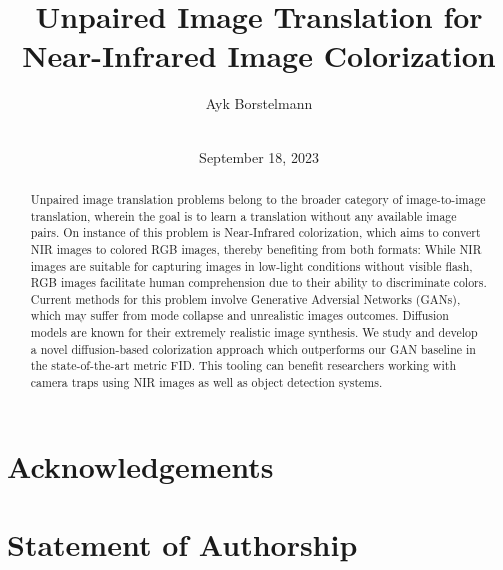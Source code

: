 \documentclass[ba,logo]{ivs-thesis}
\title{Unpaired Image Translation for Near-Infrared Image Colorization}
\author{Ayk Borstelmann\\\birthinfo{March 28, 2002 in Aschaffenburg}\\\matricnumber{3441004}}
\date{September 18, 2023}
\begin{document}
\frontmatter

\maketitle

\cleardoublepage
\begin{abstract}
	Unpaired image translation problems belong to the broader category of image-to-image translation, 
	wherein the goal is to learn a translation without any available image pairs. 
	On instance of this problem is Near-Infrared colorization, which aims to convert NIR images to colored RGB images,
	thereby benefiting from both formats:
	While NIR images are suitable for capturing images in low-light conditions without visible flash, 
	RGB images facilitate human comprehension due to their ability to discriminate colors. 
	Current methods for this problem involve Generative Adversial Networks (GANs), 
	which may suffer from mode collapse and unrealistic images outcomes. 
	Diffusion models are known for their extremely realistic image synthesis. 
	We study and develop a novel diffusion-based colorization approach which outperforms our GAN baseline in the state-of-the-art metric FID. 
	This tooling can benefit researchers working with camera traps using NIR images as well as object detection systems.
\end{abstract}

\chapter*{Acknowledgements}

\cleardoublepage
\chapter*{Statement of Authorship}

% 

\cleardoublepage
\tableofcontents


\mainmatter









\begingroup

\backmatter

\printbibliography[heading=bibintoc]

\listoffigures

\listoftables

\endgroup

\appendix
\end{document}
